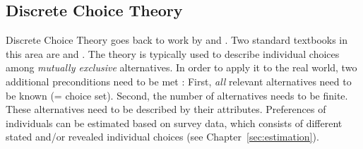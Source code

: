 \subsection{Discrete Choice Theory}
\label{ch:economicEval:describingBehavior:discreteChoice}
%
%

\label{ch:economicEval:describingBehavior:discreteChoice:foundations}
%
Discrete Choice Theory goes back to work by \citet{Luce1965PreferenceUtility} and \citet{McFadden1975DiscreteChoiceModel}. Two standard textbooks in this area are \citet{Ben-AkivaBook} and \citet{Train2003discreteChoiceBook}. The theory is typically used to describe individual choices among \emph{mutually exclusive} alternatives. In order to apply it to the real world, two additional preconditions need to be met \citep[p.16]{Train2003discreteChoiceBook}:
%
First, \emph{all} relevant alternatives need to be known (= choice set).
%
Second, the number of alternatives needs to be finite.
%
These alternatives need to be described by their attributes.
%
Preferences of individuals can be estimated based on survey data, which consists of different stated and/or revealed individual choices (see Chapter~\ref{sec:estimation}).
%

